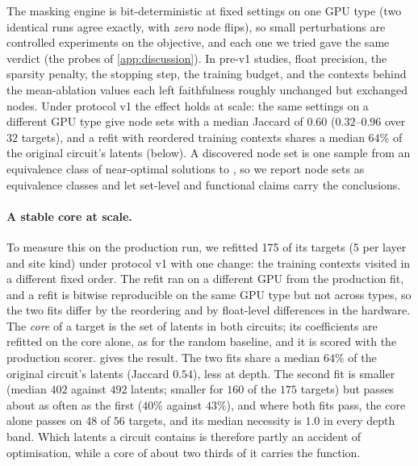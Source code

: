 \documentclass[10pt]{article}
\begin{document}
The masking engine is bit-deterministic at fixed settings on one GPU type (two identical runs agree exactly, with \emph{zero} node flips), so small perturbations are controlled experiments on the objective, and each one we tried gave the same verdict (the probes of \cref{app:discussion}).
In pre-v1 studies, float precision, the sparsity penalty, the stopping step, the training budget, and the contexts behind the mean-ablation values each left faithfulness roughly unchanged but exchanged nodes.
Under protocol v1 the effect holds at scale: the same settings on a different GPU type give node sets with a median Jaccard of $0.60$ ($0.32$--$0.96$ over $32$ targets), and a refit with reordered training contexts shares a median $64\%$ of the original circuit's latents (below).
A discovered node set is one sample from an equivalence class of near-optimal solutions to , so we report node sets as equivalence classes and let set-level and functional claims carry the conclusions.

\paragraph{A stable core at scale.}
To measure this on the production run, we refitted 175 of its targets (5 per layer and site kind) under protocol v1 with one change: the training contexts visited in a different fixed order.
The refit ran on a different GPU from the production fit, and a refit is bitwise reproducible on the same GPU type but not across types, so the two fits differ by the reordering and by float-level differences in the hardware.
The \emph{core} of a target is the set of latents in both circuits; its coefficients are refitted on the core alone, as for the random baseline, and it is scored with the production scorer.
 gives the result.
The two fits share a median $64\%$ of the original circuit's latents (Jaccard $0.54$), less at depth.
The second fit is smaller (median $402$ against $492$ latents; smaller for $160$ of the $175$ targets) but passes about as often as the first ($40\%$ against $43\%$), and where both fits pass, the core alone passes on $48$ of $56$ targets, and its median necessity is $1.0$ in every depth band.
Which latents a circuit contains is therefore partly an accident of optimisation, while a core of about two thirds of it carries the function.
\end{document}
